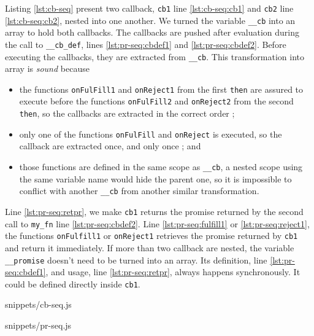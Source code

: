 Listing \ref{lst:cb-seq} present two callback, \texttt{cb1} line \ref{lst:cb-seq:cb1} and \texttt{cb2} line \ref{lst:cb-seq:cb2}, nested into one another.
We turned the variable \texttt{__cb} into an array to hold both callbacks.
The callbacks are pushed after evaluation during the call to \texttt{__cb_def}, lines \ref{lst:pr-seq:cbdef1} and \ref{lst:pr-seq:cbdef2}.
Before executing the callbacks, they are extracted from \texttt{__cb}.
This transformation into array is \textit{sound} because
\begin{itemize}
\item the functions \texttt{onFulFill1} and \texttt{onReject1} from the first \texttt{then} are assured to execute before the functions \texttt{onFulFill2} and \texttt{onReject2} from the second \texttt{then}, so the callbacks are extracted in the correct order ;
\item only one of the functions \texttt{onFulFill} and \texttt{onReject} is executed, so the callback are extracted once, and only once ; and
\item those functions are defined in the same scope as \texttt{__cb}, a nested scope using the same variable name would hide the parent one, so it is impossible to conflict with another \texttt{__cb} from another similar transformation.
\end{itemize}
Line \ref{lst:pr-seq:retpr}, we make \texttt{cb1} returns the promise returned by the second call to \texttt{my_fn} line \ref{lst:pr-seq:cbdef2}.
Line \ref{lst:pr-seq:fulfill1} or \ref{lst:pr-seq:reject1}, the functions \texttt{onFulfill1} or \texttt{onReject1} retrieves the promise returned by \texttt{cb1} and return it immediately.
If more than two callback are nested, the variable \texttt{__promise} doesn't need to be turned into an array.
Its definition, line \ref{lst:pr-seq:cbdef1}, and usage, line \ref{lst:pr-seq:retpr}, always happens synchronously.
It could be defined directly inside \texttt{cb1}.

             {snippets/cb-seq.js}

             {snippets/pr-seq.js}

